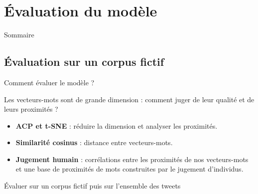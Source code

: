 \documentclass[10pt,xcolor=table,color={dvipsnames,usenames},ignorenonframetext,usepdftitle=false,french]{beamer}
\begin{document}
\hypertarget{uxe9valuation-du-moduxe8le}{%
\section{Évaluation du modèle}\label{uxe9valuation-du-moduxe8le}}

\begin{frame}{Sommaire}
\protect\hypertarget{sommaire-1}{}


\end{frame}

\hypertarget{uxe9valuation-sur-un-corpus-fictif}{%
\subsection{Évaluation sur un corpus
fictif}\label{uxe9valuation-sur-un-corpus-fictif}}

\begin{frame}{Comment évaluer le modèle ?}
\protect\hypertarget{comment-uxe9valuer-le-moduxe8le}{}

Les vecteurs-mots sont de grande dimension : comment juger de leur
qualité et de leurs proximités ?

\begin{itemize}
\item
  \textbf{ACP et t-SNE} : réduire la dimension et analyser les
  proximités.
\item
  \textbf{Similarité cosinus} : distance entre vecteurs-mots.
\item
  \textbf{Jugement humain} : corrélations entre les proximités de nos
  vecteurs-mots et une base de proximités de mots construites par le
  jugement d’individus.
\end{itemize}

\bigskip

\faArrowCircleRight{} Évaluer sur un corpus fictif puis sur l’ensemble
des tweets

\end{frame}
\end{document}
